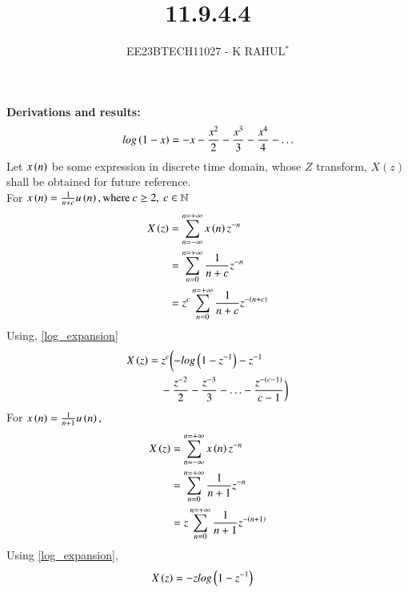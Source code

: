 \documentclass[journal,12pt,twocolumn]{IEEEtran}
\theoremstyle{remark}
\begin{document}

\vspace{3cm}
\title{11.9.4.4}
\author{EE23BTECH11027 - K RAHUL$^{*}$%
}
\maketitle
\newpage
\bigskip
\renewcommand{\thefigure}{\theenumi}
\renewcommand{\thetable}{\theenumi}
\textbf{Derivations and results:} \\
\begin{align}
        log\left(1-x\right) = -x - \frac{x^2}{2} - \frac{x^3}{3}-\frac{x^4}{4}- \ldots \label{log_expansion}
\end{align}
Let $x\left(n\right)$ be some expression in discrete time domain, whose $Z$ transform, $X(z)$ shall be obtained for future reference.\\
For  $x\left(n\right) = \frac{1}{n+c} u\left(n\right),\text{where} \: c \geq 2,\: c \in \mathbb{N}$\\
\begin{align}
    X\left(z\right) &= \sum_{n= -\infty}^{n= +\infty} x\left(n\right)z^{-n}\\
    &=\sum_{n = 0}^{n = +\infty} \frac{1}{n+c}z^{-n}\\
    &= z^c\sum_{n = 0}^{n = +\infty} \frac{1}{n+c}z^{-\left(n+c\right)} \\
\end{align}
Using, \eqref{log_expansion}\\
\begin{align}
    X\left(z\right)&= z^c \biggl(-log\left(1-z^{-1}\right)- z^{-1}\notag\\& \;\;\;\;-\frac{z^{-2}}{2}-\frac{z^{-3}}{3} - \ldots -\frac{z^{-(c-1)}}{c-1} \biggr)\label{11027_eq1}
\end{align} 
For $x\left(n\right) = \frac{1}{n+1}u\left(n\right),$\\
\begin{align}
	X\left(z\right) &=\sum_{n= -\infty}^{n= +\infty} x\left(n\right)z^{-n}\\
	&= \sum_{n = 0}^{n = +\infty} \frac{1}{n+1}z^{-n}\\
	&= z\sum_{n = 0}^{n = +\infty} \frac{1}{n+1}z^{-\left(n+1\right)} \\
\end{align}
Using \eqref{log_expansion},\\
\begin{align}
	X\left(z\right)&= -zlog\left(1-z^{-1}\right) \label{When_c_equals_1}	
\end{align}
\newpage
\end{document}
